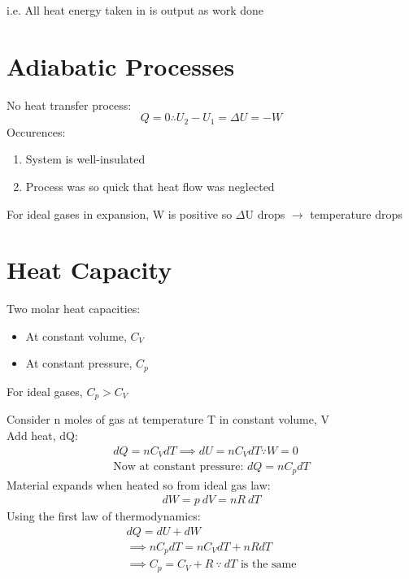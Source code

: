 \documentclass[a4paper, 11pt, fleqn, normalem]{report}
\begin{document}
i.e. All heat energy taken in is output as work done

\section*{Adiabatic Processes}
No heat transfer process:
\vspace{-10pt}
\begin{equation*}
	Q = 0 \therefore U_{2} - U_{1} = {\Delta}U = -W
\end{equation*}
Occurences:
\vspace{-8pt}
\begin{enumerate}
	\item System is well-insulated
	\item Process was so quick that heat flow was neglected
\end{enumerate}
\vspace{-8pt}
For ideal gases in expansion, W is positive so $\Delta$U drops $\rightarrow$ temperature drops

\section*{Heat Capacity}
Two molar heat capacities:
\vspace{-8pt}
\begin{itemize}
	\item[] At constant volume, $C_{V}$
	\item[] At constant pressure, $C_{p}$
\end{itemize}
\vspace{-8pt}
For ideal gases, $C_{p} > C_{V}$

Consider n moles of gas at temperature T in constant volume, V \\
Add heat, dQ:
\begin{gather*}
	dQ = nC_{V}dT \implies dU = nC_{V}dT \because W = 0 \\
	\text{Now at constant pressure: } dQ = nC_{p}dT
\end{gather*}
Material expands when heated so from ideal gas law:
\begin{gather*}
	dW = p\:dV = nR\:dT
\end{gather*}
Using the first law of thermodynamics:
\begin{gather*}
	dQ = dU + dW \\
	\implies nC_{p}dT = nC_{V}dT + nRdT \\
	\implies C_{p} = C_{V} + R ~\because~ dT \text{ is the same}
\end{gather*}
\end{document}
